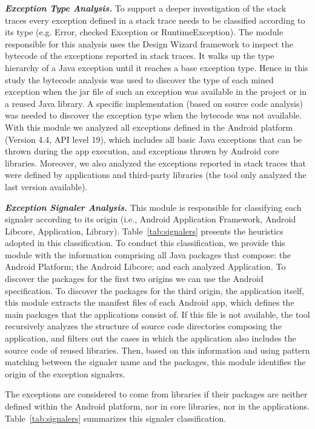 \emph{\textbf{Exception Type Analysis.}} To support a deeper investigation of the
stack traces every exception defined in a stack trace needs to be classified according to its type
(e.g. Error, checked Exception or RuntimeException). The module responsible for this analysis
uses the Design Wizard framework \cite{Brunet09} to inspect the bytecode of the exceptions reported
in stack traces.  It walks up the type hierarchy of a Java exception until it reaches
a base exception type. Hence in this study the bytecode analysis was used to discover the type
of each mined exception when the jar file of such an exception was available in the project or
in a reused  Java library. A specific implementation (based on source code analysis)
 was needed to discover the exception type when the bytecode was not available.
With this module we analyzed all exceptions defined in the Android platform (Version 4.4, API level 19),
which includes all basic Java exceptions that can be thrown during the app execution,
and exceptions thrown by Android core libraries. Moreover, we also analyzed the
exceptions reported in stack traces that were defined by applications and third-party libraries
(the tool only analyzed the last version available).

\emph{\textbf{Exception Signaler Analysis.}}
This module is responsible for classifying each signaler according
to its origin (i.e., Android Application Framework, Android Libcore, Application, Library).
Table~\ref{tab:signalers} presents the heuristics adopted in this classification.
To conduct this classification, we provide this module with the information
comprising all Java packages that compose: the Android Platform;
 the Android Libcore; and each analyzed Application. To discover the packages for the first two origins
we can use the Android specification.
To discover the packages for the third origin, the application itself, this module
extracts the manifest files of each Android app, which defines the main packages that the applications consist of.
 If this file is not available, the tool recursively analyzes the
structure of source code directories composing the application, and filters out the cases in which the application also includes the source code of reused libraries.
Then, based on this information and using pattern matching
between the signaler name and the packages, this module identifies
the origin of the exception signalers.

The exceptions are considered to come
 from libraries if their packages are neither defined
within the Android platform, nor in core libraries, nor in the applications.
Table~\ref{tab:signalers} summarizes this signaler classification.

